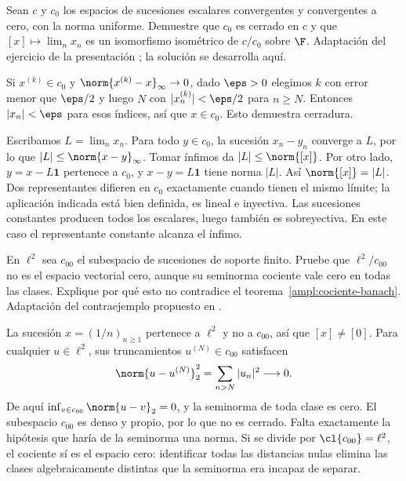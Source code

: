 \begin{ejercicio}\label{ej:ampl-cocientes-2}
Sean $c$ y $c_0$ los espacios de sucesiones escalares convergentes y convergentes a cero, con la norma uniforme. Demuestre que $c_0$ es cerrado en $c$ y que $[x]\mapsto\lim_nx_n$ es un isomorfismo isométrico de $c/c_0$ sobre $\F$. Adaptación del ejercicio de la presentación \cite{max-seminormado}; la solución se desarrolla aquí.
\end{ejercicio}
\begin{solucion}
Si $x^{(k)}\in c_0$ y $\norm{x^{(k)}-x}_\infty\to0$, dado $\eps>0$ elegimos $k$ con error menor que $\eps/2$ y luego $N$ con $|x^{(k)}_n|<\eps/2$ para $n\ge N$. Entonces $|x_n|<\eps$ para esos índices, así que $x\in c_0$. Esto demuestra cerradura.

Escribamos $L=\lim_nx_n$. Para todo $y\in c_0$, la sucesión $x_n-y_n$ converge a $L$, por lo que $|L|\le\norm{x-y}_\infty$. Tomar ínfimos da $|L|\le\norm{[x]}$. Por otro lado, $y=x-L\mathbf1$ pertenece a $c_0$, y $x-y=L\mathbf1$ tiene norma $|L|$. Así $\norm{[x]}=|L|$. Dos representantes difieren en $c_0$ exactamente cuando tienen el mismo límite; la aplicación indicada está bien definida, es lineal e inyectiva. Las sucesiones constantes producen todos los escalares, luego también es sobreyectiva. En este caso el representante constante alcanza el ínfimo.
\end{solucion}

\begin{ejercicio}\label{ej:ampl-cocientes-3}
En $\ell^2$ sea $c_{00}$ el subespacio de sucesiones de soporte finito. Pruebe que $\ell^2/c_{00}$ no es el espacio vectorial cero, aunque su seminorma cociente vale cero en todas las clases. Explique por qué esto no contradice el teorema~\ref{ampl:cociente-banach}. Adaptación del contraejemplo propuesto en \cite{max-seminormado}.
\end{ejercicio}
\begin{solucion}
La sucesión $x=(1/n)_{n\ge1}$ pertenece a $\ell^2$ y no a $c_{00}$, así que $[x]\ne[0]$. Para cualquier $u\in\ell^2$, sus truncamientos $u^{(N)}\in c_{00}$ satisfacen
\[
 \norm{u-u^{(N)}}_2^2=\sum_{n>N}|u_n|^2\longrightarrow0.
\]
De aquí $\inf_{v\in c_{00}}\norm{u-v}_2=0$, y la seminorma de toda clase es cero. El subespacio $c_{00}$ es denso y propio, por lo que no es cerrado. Falta exactamente la hipótesis que haría de la seminorma una norma. Si se divide por $\cl{c_{00}}=\ell^2$, el cociente sí es el espacio cero: identificar todas las distancias nulas elimina las clases algebraicamente distintas que la seminorma era incapaz de separar.
\end{solucion}

